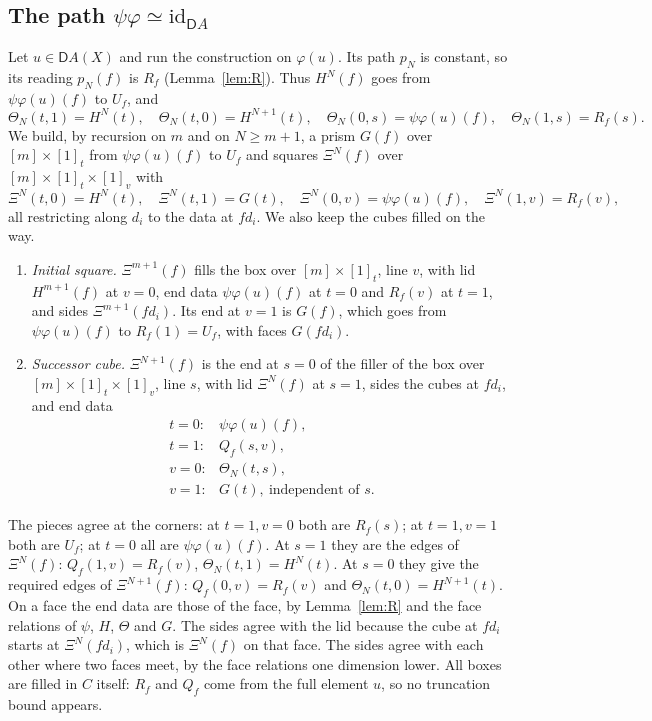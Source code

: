 \documentclass[11pt]{article}
\newcommand{\id}{\mathrm{id}}
\newcommand{\D}{\mathsf{D}}
\theoremstyle{plain}
\theoremstyle{definition}
\theoremstyle{remark}
\begin{document}
\subsection{The path $\psi\varphi\simeq\id_{\D A}$}

Let $u\in\D A(X)$ and run the construction on $\varphi(u)$. Its path
$p_N$ is constant, so its reading $p_N(f)$ is $R_f$ (Lemma~\ref{lem:R}).
Thus $H^N(f)$ goes from $\psi\varphi(u)(f)$ to $U_f$, and
\[
\Theta_N(t,1)=H^N(t),\quad\Theta_N(t,0)=H^{N+1}(t),\quad
\Theta_N(0,s)=\psi\varphi(u)(f),\quad\Theta_N(1,s)=R_f(s).
\]
We build, by recursion on $m$ and on $N\ge m+1$, a prism $G(f)$ over
$[m]\times[1]_t$ from $\psi\varphi(u)(f)$ to $U_f$ and squares
$\Xi^N(f)$ over $[m]\times[1]_t\times[1]_v$ with
\[
\Xi^N(t,0)=H^N(t),\quad\Xi^N(t,1)=G(t),\quad
\Xi^N(0,v)=\psi\varphi(u)(f),\quad\Xi^N(1,v)=R_f(v),
\]
all restricting along $d_i$ to the data at $fd_i$. We also keep the cubes
filled on the way.
\begin{enumerate}
\item \emph{Initial square.} $\Xi^{m+1}(f)$ fills the box over
  $[m]\times[1]_t$, line $v$, with lid $H^{m+1}(f)$ at $v=0$, end data
  $\psi\varphi(u)(f)$ at $t=0$ and $R_f(v)$ at $t=1$, and sides
  $\Xi^{m+1}(fd_i)$. Its end at $v=1$ is $G(f)$, which goes from
  $\psi\varphi(u)(f)$ to $R_f(1)=U_f$, with faces $G(fd_i)$.
\item \emph{Successor cube.} $\Xi^{N+1}(f)$ is the end at $s=0$ of the
  filler of the box over $[m]\times[1]_t\times[1]_v$, line $s$, with lid
  $\Xi^N(f)$ at $s=1$, sides the cubes at $fd_i$, and end data
  \[
  \begin{array}{ll}
  t=0: & \psi\varphi(u)(f),\\
  t=1: & Q_f(s,v),\\
  v=0: & \Theta_N(t,s),\\
  v=1: & G(t),\ \text{independent of }s.
  \end{array}
  \]
\end{enumerate}
The pieces agree at the corners: at $t=1,v=0$ both are $R_f(s)$; at
$t=1,v=1$ both are $U_f$; at $t=0$ all are $\psi\varphi(u)(f)$. At $s=1$
they are the edges of $\Xi^N(f)$: $Q_f(1,v)=R_f(v)$, $\Theta_N(t,1)=H^N(t)$.
At $s=0$ they give the required edges of $\Xi^{N+1}(f)$:
$Q_f(0,v)=R_f(v)$ and $\Theta_N(t,0)=H^{N+1}(t)$. On a face the end data
are those of the face, by Lemma~\ref{lem:R} and the face relations of
$\psi$, $H$, $\Theta$ and $G$. The sides agree with the lid because the
cube at $fd_i$ starts at $\Xi^N(fd_i)$, which is $\Xi^N(f)$ on that face.
The sides agree with each other where two faces meet, by the face
relations one dimension lower. All boxes are filled in $C$ itself: $R_f$
and $Q_f$ come from the full element $u$, so no truncation bound appears.
\end{document}

